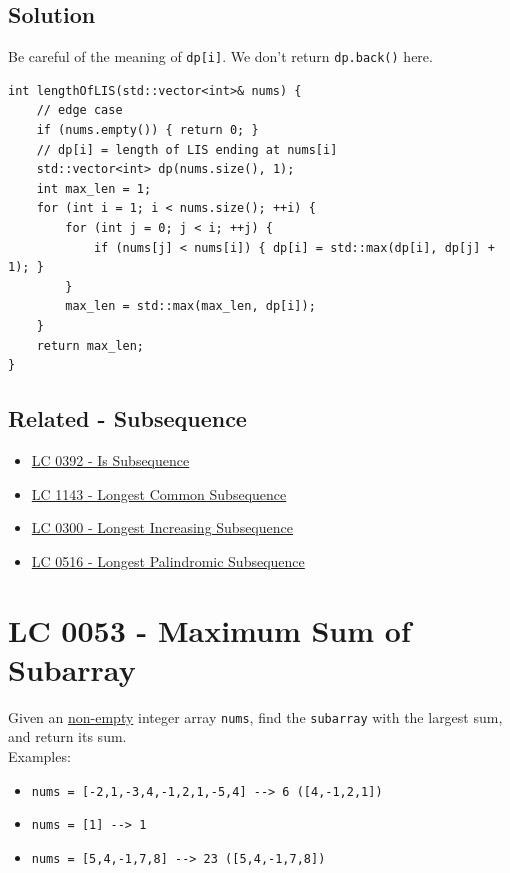 \subsection*{Solution}
Be careful of the meaning of {\colorbox{CodeBackground}{\lstinline|dp[i]|}}. We don't return {\colorbox{CodeBackground}{\lstinline|dp.back()|}} here.
\begin{lstlisting}
int lengthOfLIS(std::vector<int>& nums) {
	// edge case
	if (nums.empty()) { return 0; }
	// dp[i] = length of LIS ending at nums[i]
	std::vector<int> dp(nums.size(), 1);
	int max_len = 1;
	for (int i = 1; i < nums.size(); ++i) {
		for (int j = 0; j < i; ++j) {
			if (nums[j] < nums[i]) { dp[i] = std::max(dp[i], dp[j] + 1); }
		}
		max_len = std::max(max_len, dp[i]);
	}
	return max_len;
}
\end{lstlisting}

\subsection*{Related - Subsequence}
\begin{itemize}
	\item \hyperref[lc0392]{LC 0392 - Is Subsequence}
	\item \hyperref[lc1143]{LC 1143 - Longest Common Subsequence}
	\item \hyperref[lc0300]{LC 0300 - Longest Increasing Subsequence}
	\item \hyperref[lc0516]{LC 0516 - Longest Palindromic Subsequence}
\end{itemize}

\section{LC 0053 - Maximum Sum of Subarray}
Given an \ul{non-empty} integer array {\colorbox{CodeBackground}{\lstinline|nums|}}, find the {\colorbox{CodeBackground}{\lstinline|subarray|}} with the largest sum, and return its sum.\\

Examples:
\begin{itemize}
	\item {\colorbox{CodeBackground}{\lstinline|nums = [-2,1,-3,4,-1,2,1,-5,4] --> 6 ([4,-1,2,1])|}}
	\item {\colorbox{CodeBackground}{\lstinline|nums = [1] --> 1|}}
	\item {\colorbox{CodeBackground}{\lstinline|nums = [5,4,-1,7,8] --> 23 ([5,4,-1,7,8])|}}
\end{itemize}

